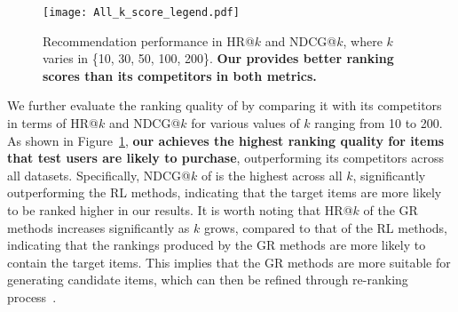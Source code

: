 \begin{figure}[t]
    \centering
    \texttt{[image: All\_k\_score\_legend.pdf]}\\
    
    \caption{
        \label{fig:experiments:varik}
        Recommendation performance in HR@$k$ and NDCG@$k$, where $k$ varies in \{10, 30, 50, 100, 200\}.
        \textbf{Our \method provides better ranking scores than its competitors in both metrics.}
    }
\end{figure}

We further evaluate the ranking quality of \method by comparing it with its competitors in terms of HR@$k$ and NDCG@$k$ for various values of $k$ ranging from 10 to 200.
As shown in Figure~\ref{fig:experiments:varik}, \textbf{our \method achieves the highest ranking quality for items that test users are likely to purchase}, outperforming its competitors across all datasets.
Specifically, NDCG@$k$ of \method is the highest across all $k$, significantly outperforming the RL methods, indicating that the target items are more likely to be ranked higher in our results.
It is worth noting that HR@$k$ of the GR methods increases significantly as $k$ grows, compared to that of the RL methods, indicating that the rankings produced by the GR methods are more likely to contain the target items.
This implies that the GR methods are more suitable for generating candidate items, which can then be refined through re-ranking process~\cite{ValizadeganJZM09}.

